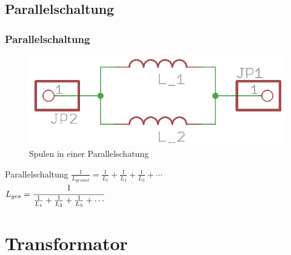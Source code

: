 \subsection*{Parallel\-schaltung}

\begin{frame}
  \frametitle{Parallelschaltung}
  \begin{center}
    \begin{figure}
      \includegraphics[width=1\textwidth,height=.35\textheight,keepaspectratio]{e06/L_Parallel.png}
      \caption{Spulen in einer Parallelschatung}
    \end{figure}
  \end{center}
  \begin{block}{Parallelschaltung}
    $\frac{1}{L_{gesamt}} = \frac{1}{L_1} + \frac{1}{L_2} + \frac{1}{L_3} + \cdots$\\
    $L_{ges} = \cfrac{1}{\frac{1}{L_1} + \frac{1}{L_2} + \frac{1}{L_3} + \cdots}$
  \end{block}
\end{frame}


\section*{Transformator}

